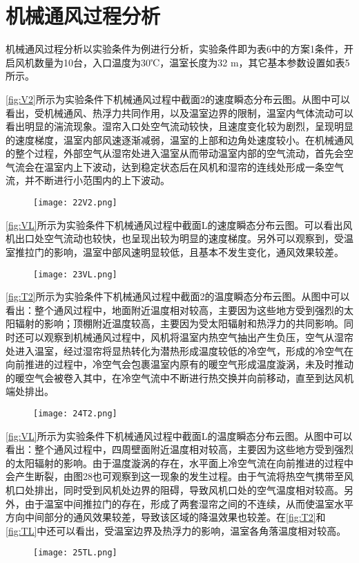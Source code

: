 \section{机械通风过程分析}
机械通风过程分析以实验条件为例进行分析，实验条件即为表6中的方案1条件，开启风机数量为10台，入口温度为30℃，温室长度为32 m，其它基本参数设置如表5所示。

\ref{fig:V2}所示为实验条件下机械通风过程中截面2的速度瞬态分布云图。从图中可以看出，受机械通风、热浮力共同作用，以及温室边界的限制，温室内气体流动可以看出明显的湍流现象。湿帘入口处空气流动较快，且速度变化较为剧烈，呈现明显的速度梯度，温室内部风速逐渐减弱，温室的上部和边角处速度较小。在机械通风的整个过程，外部空气从湿帘处进入温室从而带动温室内部的空气流动，首先会空气流会在温室内上下波动，达到稳定状态后在风机和湿帘的连线处形成一条空气流，并不断进行小范围内的上下波动。
	\begin{figure}[!htbp]
		\centering
		\texttt{[image: 22V2.png]}
	\end{figure}
\ref{fig:VL}所示为实验条件下机械通风过程中截面L的速度瞬态分布云图。可以看出风机出口处空气流动也较快，也呈现出较为明显的速度梯度。另外可以观察到，受温室推拉门的影响，温室中部风速明显较低，且基本不发生变化，通风效果较差。
	\begin{figure}[!htbp]
		\centering
		\texttt{[image: 23VL.png]}
	\end{figure}
\ref{fig:T2}所示为实验条件下机械通风过程中截面2的温度瞬态分布云图。从图中可以看出：整个通风过程中，地面附近温度相对较高，主要因为这些地方受到强烈的太阳辐射的影响；顶棚附近温度较高，主要因为受太阳辐射和热浮力的共同影响。同时还可以观察到机械通风过程中，风机将温室内热空气抽出产生负压，空气从湿帘处进入温室，经过湿帘将显热转化为潜热形成温度较低的冷空气，形成的冷空气在向前推进的过程中，冷空气会包裹温室内原有的暖空气形成温度漩涡，未及时推动的暖空气会被卷入其中，在冷空气流中不断进行热交换并向前移动，直至到达风机端处排出。
	\begin{figure}[!htbp]
		\centering
		\texttt{[image: 24T2.png]}
	\end{figure}
\ref{fig:VL}所示为实验条件下机械通风过程中截面L的温度瞬态分布云图。从图中可以看出：整个通风过程中，四周壁面附近温度相对较高，主要因为这些地方受到强烈的太阳辐射的影响。由于温度漩涡的存在，水平面上冷空气流在向前推进的过程中会产生断裂，由图28也可观察到这一现象的发生过程。由于气流将热空气携带至风机口处排出，同时受到风机处边界的阻碍，导致风机口处的空气温度相对较高。另外，由于温室中间推拉门的存在，形成了两套湿帘之间的不连续，从而使温室水平方向中间部分的通风效果较差，导致该区域的降温效果也较差。在\ref{fig:T2}和\ref{fig:TL}中还可以看出，受温室边界及热浮力的影响，温室各角落温度相对较高。
	\begin{figure}[!htbp]
		\centering
		\texttt{[image: 25TL.png]}
	\end{figure}
